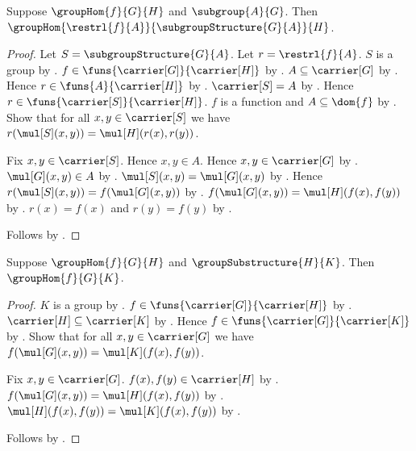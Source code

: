 \begin{theorem}\label{group_hom_domain_restriction}
    Suppose $\groupHom{f}{G}{H}$ and $\subgroup{A}{G}$.
    Then
        $\groupHom
            {\restrl{f}{A}}
            {\subgroupStructure{G}{A}}
            {H}$.
\end{theorem}
\begin{proof}
    Let $S=\subgroupStructure{G}{A}$.
    Let $r=\restrl{f}{A}$.
    $S$ is a group by .
    $f\in\funs{\carrier[G]}{\carrier[H]}$ by
        .
    $A\subseteq\carrier[G]$ by .
    Hence $r\in\funs{A}{\carrier[H]}$ by
        .
    $\carrier[S]=A$ by .
    Hence $r\in\funs{\carrier[S]}{\carrier[H]}$.
    $f$ is a function and $A\subseteq\dom{f}$ by
        .
    Show that for all $x,y\in\carrier[S]$ we have
        $r(\mul[S](x,y))=\mul[H](r(x),r(y))$.
    \begin{subproof}
        Fix $x,y\in\carrier[S]$.
        Hence $x,y\in A$.
        Hence $x,y\in\carrier[G]$ by
            .
        $\mul[G](x,y)\in A$ by .
        $\mul[S](x,y)=\mul[G](x,y)$ by
            .
        Hence $r(\mul[S](x,y))=f(\mul[G](x,y))$ by
            .
        $f(\mul[G](x,y))=\mul[H](f(x),f(y))$ by
            .
        $r(x)=f(x)$ and $r(y)=f(y)$ by
            .
    \end{subproof}
    Follows by .
\end{proof}

\begin{theorem}\label{group_hom_codomain_enlargement}
    Suppose $\groupHom{f}{G}{H}$ and
        $\groupSubstructure{H}{K}$.
    Then $\groupHom{f}{G}{K}$.
\end{theorem}
\begin{proof}
    $K$ is a group by .
    $f\in\funs{\carrier[G]}{\carrier[H]}$ by
        .
    $\carrier[H]\subseteq\carrier[K]$ by
        .
    Hence $f\in\funs{\carrier[G]}{\carrier[K]}$ by
        .
    Show that for all $x,y\in\carrier[G]$ we have
        $f(\mul[G](x,y))=\mul[K](f(x),f(y))$.
    \begin{subproof}
        Fix $x,y\in\carrier[G]$.
        $f(x),f(y)\in\carrier[H]$ by
            .
        $f(\mul[G](x,y))=\mul[H](f(x),f(y))$ by
            .
        $\mul[H](f(x),f(y))=\mul[K](f(x),f(y))$ by
            .
    \end{subproof}
    Follows by .
\end{proof}

